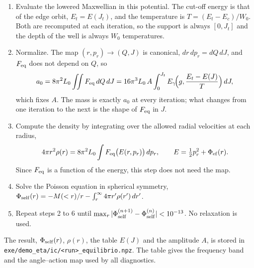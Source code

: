 \documentclass[11pt,a4paper]{article}
\begin{document}
\begin{enumerate}
\item Evaluate the lowered Maxwellian in this potential. The cut-off energy is that of
the edge orbit, $E_t=E(J_t)$, and the temperature is $T=(E_t-E_c)/W_0$. Both are
recomputed at each iteration, so the support is always $[0,J_t]$ and the depth of the
well is always $W_0$ temperatures.
\item Normalize. The map $(r,p_r)\to(Q,J)$ is canonical, $dr\,dp_r=dQ\,dJ$, and $F_{\rm
eq}$ does not depend on $Q$, so
\[
  a_0=8\pi^2L_0\iint F_{\rm eq}\,dQ\,dJ=16\pi^3L_0\,A\int_0^{J_t}E_\gamma\!\Big(g,\frac{E_t-E(J)}{T}\Big)\,dJ ,
\]
which fixes $A$. The mass is exactly $a_0$ at every iteration; what changes from one
iteration to the next is the shape of $F_{\rm eq}$ in $J$.
\item Compute the density by integrating over the allowed radial velocities at each
radius,
\[
  4\pi r^2\rho(r)=8\pi^2L_0\int F_{\rm eq}\big(E(r,p_r)\big)\,dp_r,\qquad E=\tfrac12p_r^2+\Phi_{\rm ef}(r).
\]
Since $F_{\rm eq}$ is a function of the energy, this step does not need the map.
\item Solve the Poisson equation in spherical symmetry,
$\Phi_{\rm self}(r)=-M(<r)/r-\int_r^\infty4\pi r'\rho(r')\,dr'$.
\item Repeat steps 2 to 6 until $\max_r|\Phi_{\rm self}^{(n+1)}-\Phi_{\rm self}^{(n)}|<10^{-13}$.
No relaxation is used.
\end{enumerate}
The result, $\Phi_{\rm self}(r)$, $\rho(r)$, the table $E(J)$ and the amplitude $A$, is
stored in
\texttt{exe/\allowbreak demo\_\allowbreak eta/\allowbreak ic/\allowbreak <run>\_\allowbreak equilibrio.npz}. The table gives the frequency band and the angle--action map
used by all diagnostics.
\end{document}
